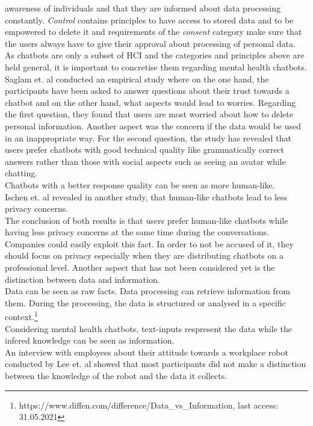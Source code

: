 \documentclass[sigconf, nonacm]{acmart}
\begin{document}
awareness of individuals and that they are informed about data processing constantly. \emph{Control} contains principles to have access to stored data and to be empowered to delete it and requirements of the \emph{consent} category make sure that the users always have to give their approval about processing of personal data.
\\
As chatbots are only a subset of HCI and the categories and principles above are held general, it is important to concretise them regarding mental health chatbots.
\\
Saglam et. al \cite{Saglam2021} conducted an empirical study where on the one hand, the participants have been asked to answer questions about their trust towards a chatbot and 
on the other hand, what aspects would lead to worries. Regarding the first question, they found that users are most worried about how to delete personal information. Another aspect was the concern if the data would be used in an inappropriate way. 
For the second question, the study has revealed that users prefer chatbots with good technical quality like grammatically correct answers rather than those with social aspects such as seeing an avatar while chatting.
\\
Chatbots with a better response quality can be seen as more human-like.
\\
Ischen et. al \cite{Ischen} revealed in another study, that human-like chatbots lead to less privacy concerns.
\\
The conclusion of both results is that users prefer human-like chatbots while having less privacy concerns at the same time during the conversations. Companies could easily exploit this fact. In order to not be accused of it, they should focus on privacy especially when they are distributing chatbots on a professional level.  
Another aspect that has not been considered yet is the distinction between data and information.
\\
Data can be seen as raw facts. Data processing can retrieve information from them. During the processing, the data is structured or analysed in a specific context.\footnote{https://www.diffen.com/difference/Data\_vs\_Information, last access: 31.05.2021}
\\ 
Considering mental health chatbots, text-inputs respresent the data while
the infered knowledge can be seen as information.
\\
An interview with employees about their attitude towards a workplace robot conducted by Lee et. al \cite{Lee2011} showed that most participants did not make a distinction between the knowledge of the robot and the data it collects.
\end{document}
